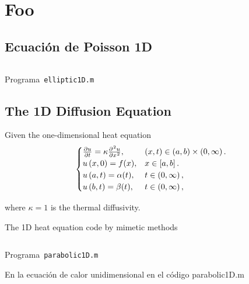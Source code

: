 \documentclass[a4paper,abstract=true]{scrreprt}
\begin{document}
\chapter{Foo}

\section{Ecuación de Poisson 1D}

\begin{listing}[ht!]
    \tiny
    \centering
    \inputminted[frame=single,framesep=10pt,linenos,firstline=1,lastline=80,highlightlines={20,29}]{octave}{../examples/octave/elliptic1D.m}
    \caption{Programa~\texttt{elliptic1D.m}}
    \label{code:elliptic1D.m}
\end{listing}

\section{The 1D Diffusion Equation}

Given the one-dimensional heat equation
\begin{equation}\label{eq:IBVPheat1d}
    \begin{cases}
        \diffp{u}{t}=
        \kappa\diffp[2]{u}{x},
         & \left(x,t\right)\in
        \left(a,b \right)\times\left(0, \infty \right). \\
        u\left(x,0\right)=f(x),
         & x\in
        \left[a,b\right].                       \\
        u\left(a,t\right)= \alpha(t), & t\in
        \left(0,\infty\right),\\
        u\left(b,t\right)= \beta(t),
         & t\in
        \left(0,\infty\right),
    \end{cases}
\end{equation}

where $\kappa=1$ is the thermal diffusivity.

The 1D heat equation code by mimetic methods

\begin{listing}[ht!]
    \tiny
    \centering
    \inputminted[frame=single,framesep=10pt,linenos,firstline=1,lastline=53,highlightlines={21,29}]{octave}{../examples/octave/parabolic1D.m}
    \caption{Programa~\texttt{parabolic1D.m}}
    \label{code:parabolic1D.m}
\end{listing}


En  la ecuación de calor unidimensional en el código parabolic1D.m
\end{document}
